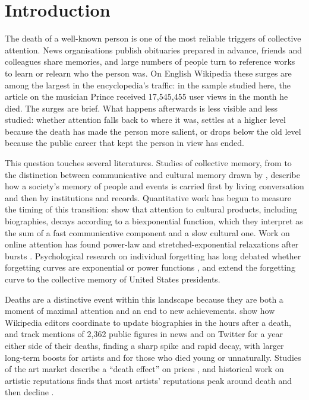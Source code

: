 \documentclass[11pt,a4paper]{article}
\begin{document}
\section{Introduction}
The death of a well-known person is one of the most reliable triggers of collective attention. News organisations publish obituaries prepared in advance, friends and colleagues share memories, and large numbers of people turn to reference works to learn or relearn who the person was. On English Wikipedia these surges are among the largest in the encyclopedia's traffic: in the sample studied here, the article on the musician Prince received 17,545,455 user views in the month he died. The surges are brief. What happens afterwards is less visible and less studied: whether attention falls back to where it was, settles at a higher level because the death has made the person more salient, or drops below the old level because the public career that kept the person in view has ended.

This question touches several literatures. Studies of collective memory, from \citet{halbwachs1992} to the distinction between communicative and cultural memory drawn by \citet{assmann1995}, describe how a society's memory of people and events is carried first by living conversation and then by institutions and records. Quantitative work has begun to measure the timing of this transition: \citet{candia2019} show that attention to cultural products, including biographies, decays according to a biexponential function, which they interpret as the sum of a fast communicative component and a slow cultural one. Work on online attention has found power-law and stretched-exponential relaxations after bursts \citep{wu2007,crane2008,ratkiewicz2010,lehmann2012}. Psychological research on individual forgetting has long debated whether forgetting curves are exponential or power functions \citep{wixted1991,rubin1996}, and \citet{roediger2014} extend the forgetting curve to the collective memory of United States presidents.

Deaths are a distinctive event within this landscape because they are both a moment of maximal attention and an end to new achievements. \citet{keegan2015} show how Wikipedia editors coordinate to update biographies in the hours after a death, and \citet{west2021} track mentions of 2,362 public figures in news and on Twitter for a year either side of their deaths, finding a sharp spike and rapid decay, with larger long-term boosts for artists and for those who died young or unnaturally. Studies of the art market describe a ``death effect'' on prices \citep{ekelund2000}, and historical work on artistic reputations finds that most artists' reputations peak around death and then decline \citep{zhang2023}.
\end{document}
